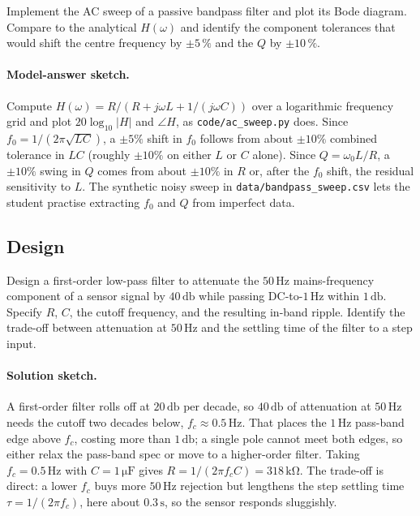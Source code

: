 \begin{exercise}
Implement the AC sweep of a passive bandpass filter and plot its Bode
diagram. Compare to the analytical $H(\omega)$ and identify the
component tolerances that would shift the centre frequency by
$\pm 5\,\%$ and the $Q$ by $\pm 10\,\%$.
\paragraph{Model-answer sketch.}
Compute $H(\omega) = R/(R + j\omega L + 1/(j\omega C))$ over a
logarithmic frequency grid and plot $20\log_{10}|H|$ and $\angle H$, as
\texttt{code/ac\_sweep.py} does. Since $f_{0} = 1/(2\pi\sqrt{LC})$, a
$\pm 5\%$ shift in $f_{0}$ follows from about $\pm 10\%$ combined
tolerance in $LC$ (roughly $\pm 10\%$ on either $L$ or $C$ alone). Since
$Q = \omega_{0}L/R$, a $\pm 10\%$ swing in $Q$ comes from about
$\pm 10\%$ in $R$ or, after the $f_{0}$ shift, the residual sensitivity
to $L$. The synthetic noisy sweep in
\texttt{data/bandpass\_sweep.csv} lets the student practise extracting
$f_{0}$ and $Q$ from imperfect data.
\end{exercise}

\subsection*{Design}

\begin{exercise}
Design a first-order low-pass filter to attenuate the $50\,\si{\hertz}$
mains-frequency component of a sensor signal by $40\,\si{\decibel}$
while passing DC-to-$1\,\si{\hertz}$ within $1\,\si{\decibel}$.
Specify $R$, $C$, the cutoff frequency, and the resulting in-band
ripple. Identify the trade-off between attenuation at $50\,\si{\hertz}$
and the settling time of the filter to a step input.
\paragraph{Solution sketch.}
A first-order filter rolls off at $20\,\si{\decibel}$ per decade, so
$40\,\si{\decibel}$ of attenuation at $50\,\si{\hertz}$ needs the cutoff
two decades below, $f_{c} \approx 0.5\,\si{\hertz}$. That places the
$1\,\si{\hertz}$ pass-band edge above $f_{c}$, costing more than
$1\,\si{\decibel}$; a single pole cannot meet both edges, so either
relax the pass-band spec or move to a higher-order filter. Taking
$f_{c} = 0.5\,\si{\hertz}$ with $C = 1\,\si{\micro\farad}$ gives $R =
1/(2\pi f_{c}C) = 318\,\si{\kilo\ohm}$. The trade-off is direct: a
lower $f_{c}$ buys more $50\,\si{\hertz}$ rejection but lengthens the
step settling time $\tau = 1/(2\pi f_{c})$, here about $0.3\,\si{
\second}$, so the sensor responds sluggishly.
\end{exercise}

